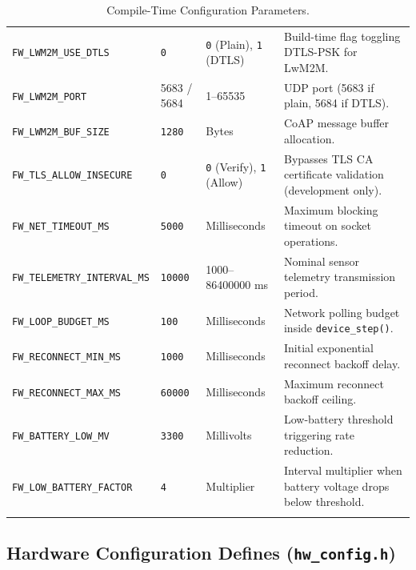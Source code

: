 \documentclass[11pt,a4paper]{article}
\newcommand{\code}[1]{\texttt{#1}}
\begin{document}
\begin{longtable}{p{4.5cm} p{2.2cm} p{3.5cm} p{5cm}}
\addlinespace
\code{FW\_LWM2M\_USE\_DTLS}& \code{0} & \code{0} (Plain), \code{1} (DTLS) & Build-time flag toggling DTLS-PSK for LwM2M. \\
\addlinespace
\code{FW\_LWM2M\_PORT} & 5683 / 5684 & 1--65535 & UDP port (5683 if plain, 5684 if DTLS). \\
\addlinespace
\code{FW\_LWM2M\_BUF\_SIZE} & \code{1280} & Bytes & CoAP message buffer allocation. \\
\addlinespace
\code{FW\_TLS\_ALLOW\_INSECURE}& \code{0} & \code{0} (Verify), \code{1} (Allow) & Bypasses TLS CA certificate validation (development only). \\
\addlinespace
\code{FW\_NET\_TIMEOUT\_MS} & \code{5000} & Milliseconds & Maximum blocking timeout on socket operations. \\
\addlinespace
\code{FW\_TELEMETRY\_INTERVAL\_MS}& \code{10000} & 1000--86400000 ms & Nominal sensor telemetry transmission period. \\
\addlinespace
\code{FW\_LOOP\_BUDGET\_MS} & \code{100} & Milliseconds & Network polling budget inside \code{device\_step()}. \\
\addlinespace
\code{FW\_RECONNECT\_MIN\_MS} & \code{1000} & Milliseconds & Initial exponential reconnect backoff delay. \\
\addlinespace
\code{FW\_RECONNECT\_MAX\_MS} & \code{60000} & Milliseconds & Maximum reconnect backoff ceiling. \\
\addlinespace
\code{FW\_BATTERY\_LOW\_MV} & \code{3300} & Millivolts & Low-battery threshold triggering rate reduction. \\
\addlinespace
\code{FW\_LOW\_BATTERY\_FACTOR}& \code{4} & Multiplier & Interval multiplier when battery voltage drops below threshold. \\
\caption{Compile-Time Configuration Parameters.}
\label{tab:compile_params}
\end{longtable}

\subsection{Hardware Configuration Defines (\code{hw\_config.h})}
\end{document}
